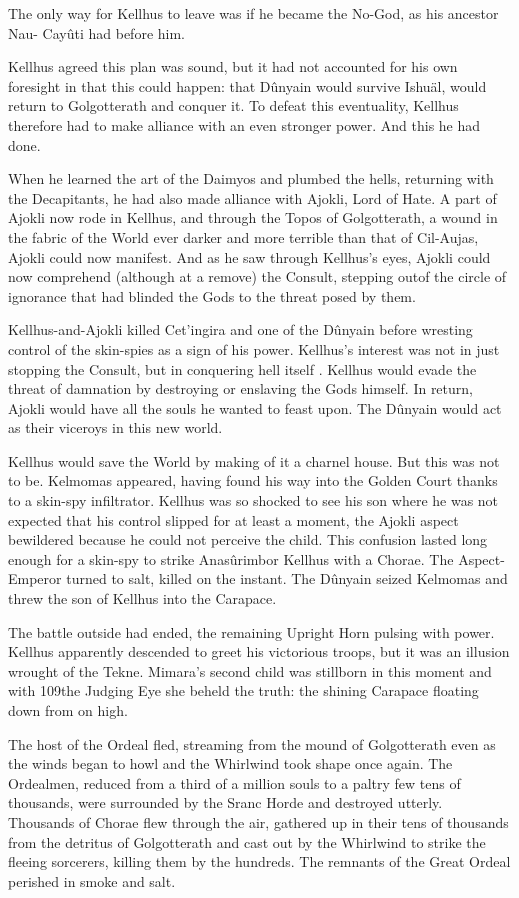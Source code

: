 \documentclass[]{book}
\begin{document}
The only way for Kellhus to leave was if he became the No-God, as his ancestor Nau-
Cayûti had before him.

Kellhus agreed this plan was sound, but it had not accounted for his own foresight in
that this could happen: that Dûnyain would survive Ishuäl, would return to
Golgotterath and conquer it. To defeat this eventuality, Kellhus therefore had to make
alliance with an even stronger power. And this he had done.

When he learned the art of the Daimyos and plumbed the hells, returning with the
Decapitants, he had also made alliance with Ajokli, Lord of Hate. A part of Ajokli now
rode in Kellhus, and through the Topos of Golgotterath, a wound in the fabric of the
World ever darker and more terrible than that of Cil-Aujas, Ajokli could now manifest.
And as he saw through Kellhus's eyes, Ajokli could now comprehend (although at a
remove) the Consult, stepping outof the circle of ignorance that had blinded the Gods
to the threat posed by them.

Kellhus-and-Ajokli killed Cet'ingira and one of the Dûnyain before wresting control of
the skin-spies as a sign of his power. Kellhus's interest was not in just stopping the
Consult, but in conquering hell itself . Kellhus would evade the threat of damnation by
destroying or enslaving the Gods himself. In return, Ajokli would have all the souls he
wanted to feast upon. The Dûnyain would act as their viceroys in this new world.

Kellhus would save the World by making of it a charnel house. But this was not to be.
Kelmomas appeared, having found his way into the Golden Court thanks to a skin-spy
infiltrator. Kellhus was so shocked to see his son where he was not expected that his
control slipped for at least a moment, the Ajokli aspect bewildered because he could
not perceive the child. This confusion lasted long enough for a skin-spy to strike
Anasûrimbor Kellhus with a Chorae. The Aspect-Emperor turned to salt, killed on the
instant. The Dûnyain seized Kelmomas and threw the son of Kellhus into the
Carapace.

The battle outside had ended, the remaining Upright Horn pulsing with power.
Kellhus apparently descended to greet his victorious troops, but it was an illusion
wrought of the Tekne. Mimara's second child was stillborn in this moment and with
109the Judging Eye she beheld the truth: the shining Carapace floating down from on
high.

The host of the Ordeal fled, streaming from the mound of Golgotterath even as the
winds began to howl and the Whirlwind took shape once again. The Ordealmen,
reduced from a third of a million souls to a paltry few tens of thousands, were
surrounded by the Sranc Horde and destroyed utterly. Thousands of Chorae flew
through the air, gathered up in their tens of thousands from the detritus of
Golgotterath and cast out by the Whirlwind to strike the fleeing sorcerers, killing them
by the hundreds. The remnants of the Great Ordeal perished in smoke and salt.
\end{document}
